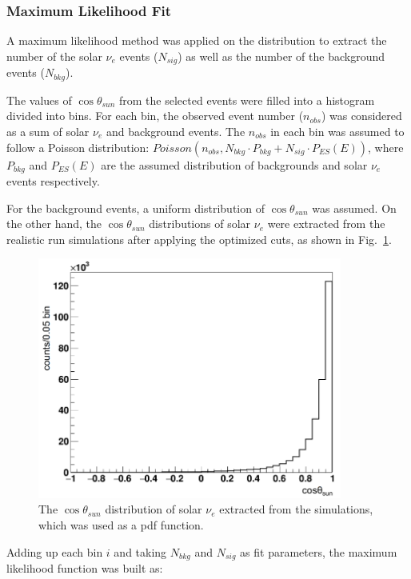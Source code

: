 \subsubsection{Maximum Likelihood Fit}\label{poisson_fit}
A maximum likelihood method was applied on the distribution to extract the number of the solar $\nu_e$ events ($N_{sig}$) as well as the number of the background events ($N_{bkg}$).

The values of $\cos\theta_{sun}$ from the selected events were filled into a histogram divided into bins.
For each bin, the observed event number ($n_{obs}$) was considered as a sum of solar $\nu_e$ and background events. The $n_{obs}$ in each bin was assumed to follow a Poisson distribution: $Poisson(n_{obs}, N_{bkg}\cdot P_{bkg}+N_{sig}\cdot P_{ES}(E))$, where $P_{bkg}$ and $P_{ES}(E)$ are the assumed distribution of backgrounds and solar $\nu_e$ events respectively.

For the background events, a uniform distribution of $\cos\theta_{sun}$ was assumed. On the other hand, the $\cos\theta_{sun}$ distributions of solar $\nu_e$ were extracted from the realistic run simulations after applying the optimized cuts, as shown in Fig.~\ref{solarPDF}. 

\begin{figure}[!htb]
	\centering
	\includegraphics[width=10cm]{solarPDF.png}
	\caption{The $\cos\theta_{sun}$ distribution of solar $\nu_e$ extracted from the simulations, which was used as a pdf function.}
	\label{solarPDF}
\end{figure}

Adding up each bin $i$ and taking $N_{bkg}$ and $N_{sig}$ as fit parameters, the maximum likelihood function was built as\cite{pdg2020}:

